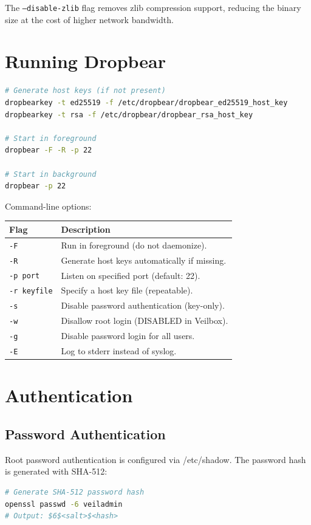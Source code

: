The \texttt{--disable-zlib} flag removes zlib compression support,
reducing the binary size at the cost of higher network bandwidth.

\section{Running Dropbear}

\begin{lstlisting}[language=bash]
# Generate host keys (if not present)
dropbearkey -t ed25519 -f /etc/dropbear/dropbear_ed25519_host_key
dropbearkey -t rsa -f /etc/dropbear/dropbear_rsa_host_key

# Start in foreground
dropbear -F -R -p 22

# Start in background
dropbear -p 22
\end{lstlisting}

Command-line options:
\begin{longtable}{|p{3cm}|p{10cm}|}
\hline
\textbf{Flag} & \textbf{Description} \\
\hline
\texttt{-F} & Run in foreground (do not daemonize). \\
\texttt{-R} & Generate host keys automatically if missing. \\
\texttt{-p port} & Listen on specified port (default: 22). \\
\texttt{-r keyfile} & Specify a host key file (repeatable). \\
\texttt{-s} & Disable password authentication (key-only). \\
\texttt{-w} & Disallow root login (DISABLED in Veilbox). \\
\texttt{-g} & Disable password login for all users. \\
\texttt{-E} & Log to stderr instead of syslog. \\
\hline
\end{longtable}

\section{Authentication}

\subsection{Password Authentication}

Root password authentication is configured via /etc/shadow. The password
hash is generated with SHA-512:

\begin{lstlisting}[language=bash]
# Generate SHA-512 password hash
openssl passwd -6 veiladmin
# Output: $6$<salt>$<hash>
\end{lstlisting}

